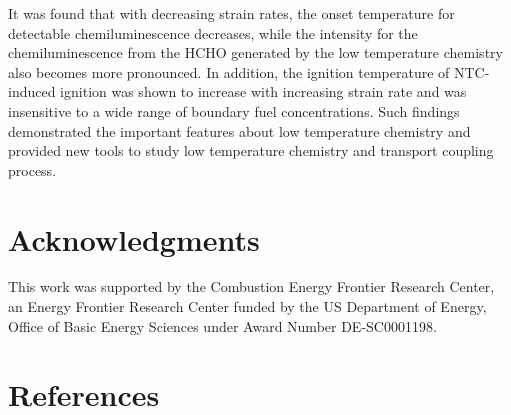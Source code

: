 \documentclass[review,3p,times]{elsarticleUS}
\begin{document}
It was found that with decreasing strain rates, the onset temperature for detectable chemiluminescence decreases, while the intensity for the chemiluminescence from the HCHO generated by the low temperature chemistry also becomes more pronounced. In addition, the ignition temperature of NTC-induced ignition was shown to increase with increasing strain rate and was insensitive to a wide range of boundary fuel concentrations. Such findings demonstrated the important features about low temperature chemistry and provided new tools to study low temperature chemistry and transport coupling process. 

\section*{Acknowledgments}
This work was supported by the Combustion Energy Frontier Research Center, an Energy Frontier Research Center funded by the US Department of Energy, Office of Basic Energy Sciences under Award Number DE-SC0001198.

\section*{References}



\renewcommand{\thefigure}{\arabic{figure}}
\renewcommand{\thetable}{\arabic{table}}
\end{document}
